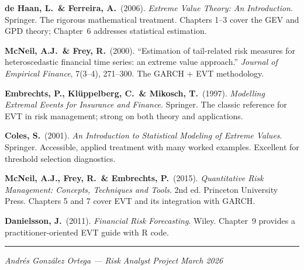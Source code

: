\documentclass[11pt, a4paper]{article}
\theoremstyle{definition}
\theoremstyle{plain}
\theoremstyle{remark}
\begin{document}
\begin{enumerate}[label={[\arabic*]}, leftmargin=2cm]
    \item \textbf{de Haan, L.\ \& Ferreira, A.}\ (2006).
          \emph{Extreme Value Theory: An Introduction}.
          Springer.
          The rigorous mathematical treatment.
          Chapters 1--3 cover the GEV and GPD theory;
          Chapter~6 addresses statistical estimation.

    \item \textbf{McNeil, A.J.\ \& Frey, R.}\ (2000).
          ``Estimation of tail-related risk measures for heteroscedastic financial time series:
          an extreme value approach.''
          \emph{Journal of Empirical Finance}, 7(3--4), 271--300.
          The GARCH + EVT methodology.

    \item \textbf{Embrechts, P., Kl\"uppelberg, C.\ \& Mikosch, T.}\ (1997).
          \emph{Modelling Extremal Events for Insurance and Finance}.
          Springer.
          The classic reference for EVT in risk management;
          strong on both theory and applications.

    \item \textbf{Coles, S.}\ (2001).
          \emph{An Introduction to Statistical Modeling of Extreme Values}.
          Springer.
          Accessible, applied treatment with many worked examples.
          Excellent for threshold selection diagnostics.

    \item \textbf{McNeil, A.J., Frey, R.\ \& Embrechts, P.}\ (2015).
          \emph{Quantitative Risk Management: Concepts, Techniques and Tools}. 2nd ed.
          Princeton University Press.
          Chapters 5 and 7 cover EVT and its integration with GARCH.

    \item \textbf{Danielsson, J.}\ (2011).
          \emph{Financial Risk Forecasting}.
          Wiley.
          Chapter~9 provides a practitioner-oriented EVT guide with R code.
\end{enumerate}

\vfill
\hrule
\smallskip
\noindent\textit{Andr\'es Gonz\'alez Ortega --- Risk Analyst Project} \hfill \textit{March 2026}
\end{document}
